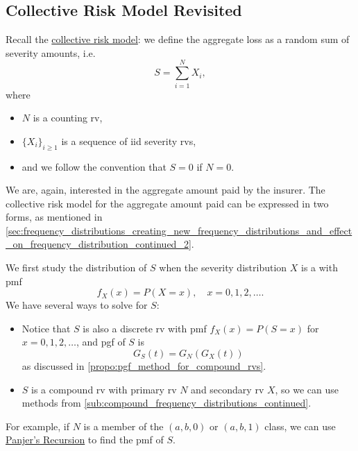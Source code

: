 \documentclass[notoc,notitlepage]{tufte-book}
\begin{document}

\subsection{Collective Risk Model Revisited}%
\label{sub:collective_risk_model_revisted}

Recall the \hyperref[defn:collective_risk_model]{collective risk model}: we define the aggregate loss as a random sum of severity amounts, i.e.
\begin{equation*}
  S = \sum_{i=1}^{N} X_i,
\end{equation*}
where
\begin{itemize}
  \item $N$ is a counting rv,
  \item $\{ X_i \}_{i \geq 1}$ is a sequence of iid severity rvs,
  \item and we follow the convention that $S = 0$ if $N = 0$.
\end{itemize}

We are, again, interested in the aggregate amount paid by the insurer. The collective risk model for the aggregate amount paid can be expressed in two forms, as mentioned in \cref{sec:frequency_distributions_creating_new_frequency_distributions_and_effect_on_frequency_distribution_continued_2}.

We first study the distribution of $S$ when the severity distribution $X$ is a  with pmf
\begin{equation*}
  f_X(x) = P(X = x), \quad x = 0, 1, 2, \ldots.
\end{equation*}
We have several ways to solve for $S$:
\begin{itemize}
  \item Notice that $S$ is also a discrete rv with pmf $f_X(x) = P(S = x)$ for $x = 0, 1, 2, \ldots$, and pgf of $S$ is
    \begin{equation*}
      G_S(t) = G_N( G_X(t) )
    \end{equation*}
    as discussed in \cref{propo:pgf_method_for_compound_rvs}.
  \item $S$ is a compound rv with primary rv $N$ and secondary rv $X$, so we can use methods from \cref{sub:compound_frequency_distributions_continued}.
\end{itemize}

For example, if $N$ is a member of the $(a, b, 0)$ or $(a, b, 1)$ class, we can use \hyperref[thm:panjer_s_recursion_for_a_b_0_class]{Panjer's Recursion} to find the pmf of $S$.
\end{document}
